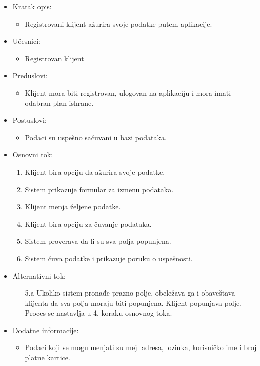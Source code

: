 
\begin{itemize}
    \item Kratak opis:
        \begin{itemize}
            \item Registrovani klijent ažurira svoje podatke putem aplikacije.
        \end{itemize}
    \item Učesnici:
        \begin{itemize}
            \item Registrovan klijent
        \end{itemize}
    \item Preduslovi:
        \begin{itemize}
            \item Klijent mora biti registrovan, ulogovan na aplikaciju i mora imati odabran plan ishrane.
        \end{itemize}
    \item Postuslovi:
        \begin{itemize}
            \item Podaci su uspešno sačuvani u bazi podataka.
        \end{itemize}
    \item Osnovni tok:
        \begin{enumerate}
            \item Klijent bira opciju da ažurira svoje podatke.
            \item Sistem prikazuje formular za izmenu podataka.
            \item Klijent menja željene podatke. 
            \item Klijent bira opciju za čuvanje podataka.
            \item Sistem proverava da li su sva polja popunjena.
            \item Sistem čuva podatke i prikazuje poruku o uspešnosti.
        \end{enumerate}
    \item Alternativni tok:
        \begin{itemize}
            \item[5.a] Ukoliko sistem pronađe prazno polje, obeležava ga i obaveštava klijenta da sva polja moraju biti popunjena. Klijent popunjava polje. Proces se nastavlja u 4. koraku osnovnog toka.
        \end{itemize}
    \item Dodatne informacije:
        \begin{itemize}
            \item Podaci koji se mogu menjati su mejl adresa, lozinka, korisničko ime i broj platne kartice.
        \end{itemize}
\end{itemize}

